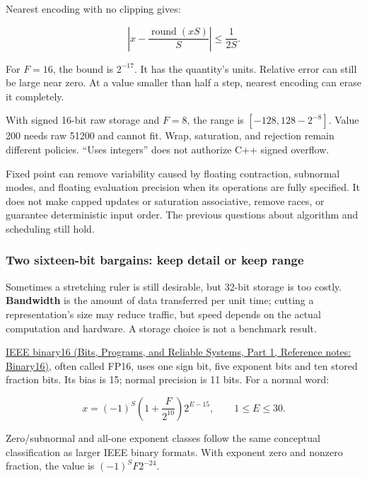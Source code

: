 \hypertarget{05-engine-i-ch001-a-constant-grid-changes-error-not-the-existence-of-error}{}

Nearest encoding with no clipping gives:

\[
\left|x-\frac{\operatorname{round}(xS)}{S}\right|\le\frac{1}{2S}.
\]

For \(F=16\), the bound is \(2^{-17}\). It has the quantity's units. Relative error can still be large near zero. At a value smaller than half a step, nearest encoding can erase it completely.

With signed 16-bit raw storage and \(F=8\), the range is \([-128,128-2^{-8}]\). Value 200 needs raw 51200 and cannot fit. Wrap, saturation, and rejection remain different policies. ``Uses integers'' does not authorize C++ signed overflow.

Fixed point can remove variability caused by floating contraction, subnormal modes, and floating evaluation precision when its operations are fully specified. It does not make capped updates or saturation associative, remove races, or guarantee deterministic input order. The previous questions about algorithm and scheduling still hold.

\subsubsection{Two sixteen-bit bargains: keep detail or keep range}\label{05-engine-i-ch001-two-sixteen-bit-bargains-keep-detail-or-keep-range}

\hypertarget{05-engine-i-ch001-two-sixteen-bit-bargains-keep-detail-or-keep-range}{}

Sometimes a stretching ruler is still desirable, but 32-bit storage is too costly. \textbf{Bandwidth} is the amount of data transferred per unit time; cutting a representation's size may reduce traffic, but speed depends on the actual computation and hardware. A storage choice is not a benchmark result.

\href{../01-Bits-Programs-and-Reliable-Systems-P01/main.pdf\#appendix-34443cec7170}{IEEE binary16 (Bits, Programs, and Reliable Systems, Part 1, Reference notes: Binary16)}, often called FP16, uses one sign bit, five exponent bits and ten stored fraction bits. Its bias is 15; normal precision is 11 bits. For a normal word:

\[
x=(-1)^S\left(1+\frac{F}{2^{10}}\right)2^{E-15},
\qquad 1\le E\le30.
\]

Zero/subnormal and all-one exponent classes follow the same conceptual classification as larger IEEE binary formats. With exponent zero and nonzero fraction, the value is \((-1)^SF2^{-24}\).

